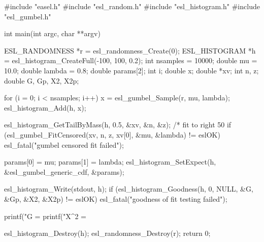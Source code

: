 \begin{cchunk}
#include "easel.h"
#include "esl_random.h"
#include "esl_histogram.h"
#include "esl_gumbel.h"

int
main(int argc, char **argv)
{
  ESL_RANDOMNESS *r  = esl_randomness_Create(0);
  ESL_HISTOGRAM  *h  = esl_histogram_CreateFull(-100, 100, 0.2);
  int     nsamples    = 10000;
  double  mu          = 10.0;
  double  lambda      = 0.8;
  double  params[2];
  int     i;
  double  x;
  double *xv;
  int     n, z;
  double  G, Gp, X2, X2p;

  for (i = 0; i < nsamples; i++) {
    x = esl_gumbel_Sample(r, mu, lambda);
    esl_histogram_Add(h, x);
  }

  esl_histogram_GetTailByMass(h, 0.5, &xv, &n, &z); /* fit to right 50%
  if (esl_gumbel_FitCensored(xv, n, z, xv[0], &mu, &lambda) != eslOK)
    esl_fatal("gumbel censored fit failed");

  params[0] = mu;
  params[1] = lambda;
  esl_histogram_SetExpect(h, &esl_gumbel_generic_cdf, &params);

  esl_histogram_Write(stdout, h);
  if (esl_histogram_Goodness(h, 0, NULL, &G, &Gp, &X2, &X2p) != eslOK)
    esl_fatal("goodness of fit testing failed");

  printf("G   = %
  printf("X^2 = %

  esl_histogram_Destroy(h);
  esl_randomness_Destroy(r);
  return 0;
}
\end{cchunk}
